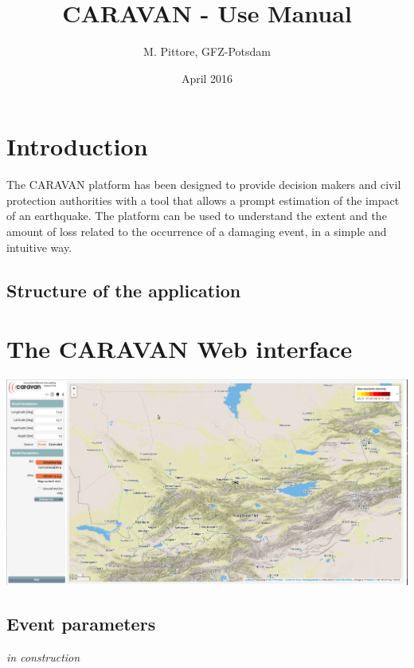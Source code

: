 \documentclass[12p]{article}
\begin{document}
\title{CARAVAN - Use Manual}
\author{M. Pittore, GFZ-Potsdam}
\date{April 2016}
\maketitle

\tableofcontents

\section{Introduction}

The CARAVAN platform has been designed to provide decision makers and civil protection authorities with a tool that allows a prompt estimation of the impact of an earthquake. The platform can be used to understand the extent and the amount of loss related to the occurrence of a damaging event, in a simple and intuitive way. 

\subsection{Structure of the application}

\section{The CARAVAN Web interface}

\begin{center}
	\includegraphics[width=\textwidth]{fig1}
\end{center}

\subsection{Event parameters}
\emph{in construction}
\end{document}
